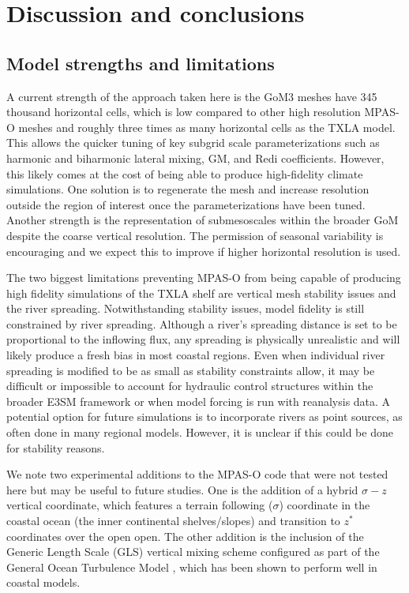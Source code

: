 \section{Discussion and conclusions}
\subsection{Model strengths and limitations}
A current strength of the approach taken here is the GoM3 meshes have 345 thousand horizontal cells, which is low compared to other high resolution MPAS-O meshes \citep{caldwell2019doe, hoch2020mpas} and roughly three times as many horizontal cells as the TXLA model. This allows the quicker tuning of key subgrid scale parameterizations such as harmonic and biharmonic lateral mixing, GM, and Redi coefficients. However, this likely comes at the cost of being able to produce high-fidelity climate simulations. One solution is to regenerate the mesh and increase resolution outside the region of interest once the parameterizations have been tuned. Another strength is the representation of submesoscales within the broader GoM despite the coarse vertical resolution. The permission of seasonal variability is encouraging and we expect this to improve if higher horizontal resolution is used. 

The two biggest limitations preventing MPAS-O from being capable of producing high fidelity simulations of the TXLA shelf are vertical mesh stability issues and the river spreading. Notwithstanding stability issues, model fidelity is still constrained by river spreading. Although a river's spreading distance is set to be proportional to the inflowing flux, any spreading is physically unrealistic and will likely produce a fresh bias in most coastal regions. Even when individual river spreading is modified to be as small as stability constraints allow, it may be difficult or impossible to account for hydraulic control structures within the broader E3SM framework or when model forcing is run with reanalysis data. A potential option for future simulations is to incorporate rivers as point sources, as often done in many regional models. However, it is unclear if this could be done for stability reasons.

We note two experimental additions to the MPAS-O code that were not tested here but may be useful to future studies. One is the addition of a hybrid $\sigma-z$ vertical coordinate, which features a terrain following ($\sigma$) coordinate in the coastal ocean (the inner continental shelves/slopes) and transition to $z^*$ coordinates over the open open. The other addition is the inclusion of the Generic Length Scale (GLS) vertical mixing scheme configured as part of the General Ocean Turbulence Model \citep{burchard1999gotm, Warner_2005}, which has been shown to perform well in coastal models. 

